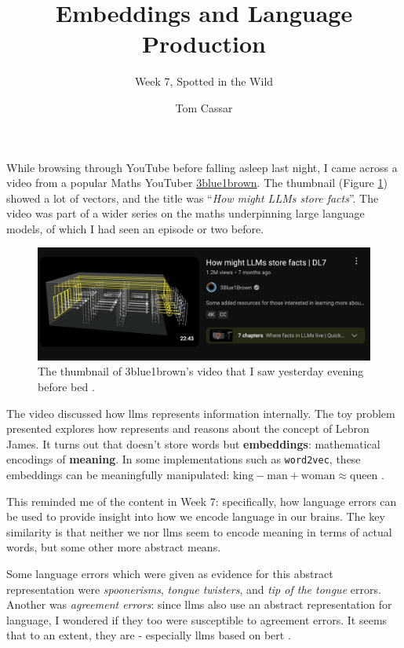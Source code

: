 \documentclass[fontsize=12pt]{article}
\title{ Embeddings and Language Production}
\author{Week 7, Spotted in the Wild}
\date{Tom Cassar}
\begin{document}

\maketitle

While browsing through YouTube before falling asleep last night, I came across a
video from a popular Maths YouTuber 
\href{https://www.youtube.com/@3blue1brown}{3blue1brown}. The thumbnail (Figure
\ref{fig:thumbnail}) showed a
lot of vectors, and the title was ``\textit{How might LLMs store facts}''. The
video was part of a wider series on the maths underpinning large language
models, of which I had seen an episode or two before. \newline 

\begin{figure}[H]
    \centering
    \includegraphics[width=0.8 \linewidth]{./img/thumbnail.png} 
    \caption{The thumbnail of 3blue1brown's video that I saw yesterday evening
    before bed \cite{3Blue1Brown_2024}.}
    \label{fig:thumbnail}
\end{figure}

The video discussed how \acp{llm} represents information internally. The toy
problem presented explores how  represents and reasons about the
concept of Lebron James. It turns out that  doesn't store words
but \textbf{embeddings}: mathematical encodings of \textbf{meaning}. In some
implementations such as \texttt{word2vec}, these embeddings can be meaningfully
manipulated: $\text{king} - \text{man} + \text{woman} \approx \text{queen}$
\cite{tensorflow_word_embeddings}. \newline

This reminded me of the content in Week 7: specifically, how language errors can
be used to provide insight into how we encode language in our brains. The key
similarity is that neither we nor \acp{llm} seem to encode meaning in terms of
actual words, but some other more abstract means. \newline

Some language errors which were given as evidence for this abstract
representation were \textit{spoonerisms}, \textit{tongue twisters}, and
\textit{tip of the tongue} errors. Another was \textit{agreement errors}: since
\acp{llm} also use an abstract representation for language, I wondered if they
too were susceptible to agreement errors. It seems that to an extent, they are -
especially \acp{llm} based on \ac{bert} \cite{bazhukov-etal-2024-models}.



\end{document}

